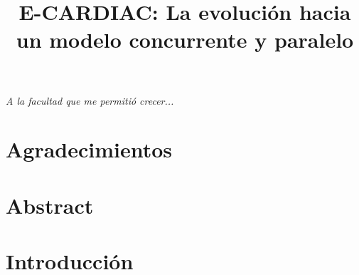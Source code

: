 \documentclass[letterpaper,12pt,oneside]{book}
\title{E-CARDIAC: La evolución hacia un modelo concurrente y paralelo}
\begin{document}
	\frontmatter

    

\chapter*{}
\begin{flushright}%
  \emph{A la facultad que me permitió crecer...}
  \thispagestyle{empty}
\end{flushright}

\chapter{Agradecimientos}

\chapter{Abstract}

\chapter{Introducción}
\end{document}

